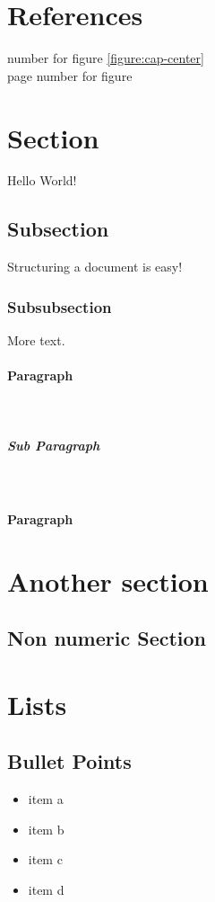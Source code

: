 \documentclass[12pt]{article}
\begin{document}
\pagebreak
\section{References}

number for figure \ref{figure:cap-center} \\
page number for figure \pageref{figure:cap-center}

\section{Section}

Hello World!

\subsection{Subsection}

Structuring a document is easy!

\subsubsection{Subsubsection}

More text.

\paragraph{Paragraph}
\lipsum[1]\\

\subparagraph{Sub Paragraph}
\lipsum[1]\\

\paragraph{Paragraph}
\lipsum[1]

\section{Another section}

\subsection*{Non numeric Section}

\section{Lists}

\subsection*{Bullet Points}
\begin{itemize}
\item item a
\item item b
\item item c
\item item d
\end{itemize}
\end{document}
